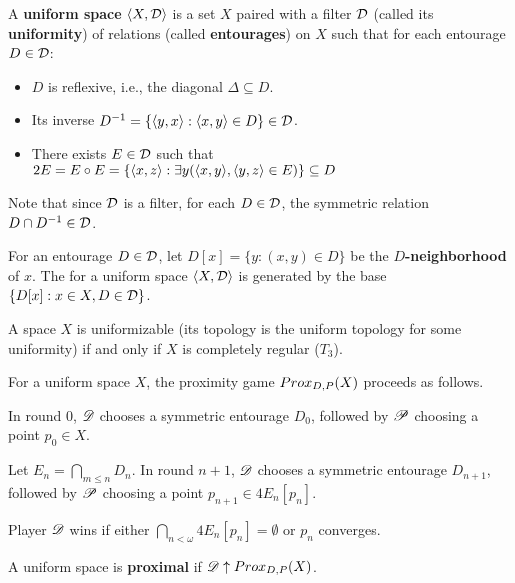 



\begin{definition}
  A \textbf{uniform space} $\langle X,\mathcal{D}\rangle$ is a set $X$ paired with a filter $\mathcal{D}$ (called its \textbf{uniformity}) of relations (called \textbf{entourages}) on $X$ such that for each entourage $D\in \mathcal{D}$:
    \begin{itemize}
      \item $D$ is reflexive, i.e., the diagonal $\Delta\subseteq D$.
      \item Its inverse $D^{-1}=\{\langle y,x\rangle:\langle x,y\rangle\in D\}\in \mathcal{D}$.
      \item There exists $E\in\mathcal{D}$ such that $2E=E\circ E=\{\langle x,z\rangle:\exists y(\langle x,y\rangle,\langle y,z\rangle\in E)\}\subseteq D$
    \end{itemize}
  Note that since $\mathcal{D}$ is a filter, for each $D\in\mathcal{D}$, the symmetric relation $D\cap D^{-1}\in \mathcal{D}$.
\end{definition}

\begin{definition}
  For an entourage $D\in\mathcal{D}$, let $D[x]=\{y:(x,y)\in D\}$ be the \textbf{$D$-neighborhood} of $x$. The  for a uniform space $\langle X,\mathcal{D}\rangle$ is generated by the base $\{D[x]:x\in X,D\in\mathcal{D}\}$.
\end{definition}

\begin{theorem}
  A space $X$ is uniformizable (its topology is the uniform topology for some uniformity) if and only if $X$ is completely regular ($T_3$).
\end{theorem}

\begin{definition}
  For a uniform space $X$, the proximity game $Prox_{D,P}(X)$ proceeds as follows. 

  In round $0$, $\mathscr{D}$ chooses a symmetric entourage $D_0$, followed by $\mathscr{P}$ choosing a point $p_0\in X$. 

  Let $E_n=\bigcap_{m\leq n}D_n$. In round $n+1$, $\mathscr{D}$ chooses a symmetric entourage $D_{n+1}$, followed by $\mathscr{P}$ choosing a point $p_{n+1}\in 4E_n[p_n]$.

  Player $\mathscr{D}$ wins if either $\bigcap_{n<\omega} 4E_n[p_n] = \emptyset$ or $p_n$ converges.
\end{definition}

\begin{definition}
  A uniform space is \textbf{proximal} if $\mathscr{D} \uparrow Prox_{D,P}(X)$.
\end{definition}

